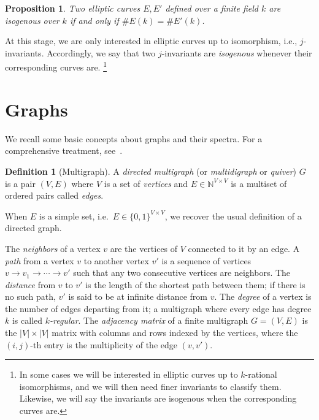 \documentclass[10pt]{article}
\theoremstyle{plain}
\newtheorem{proposition}[theorem]{Proposition}
\theoremstyle{definition}
\newtheorem{definition}[theorem]{Definition}
\begin{document}
\begin{prposition}
\begin{proposition}
  \label{coro:serre-tate}
  Two elliptic curves $E,E'$ defined over a finite field $k$ are
  isogenous over $k$ if and only if $\#E(k)=\#E'(k)$.
\end{proposition}

At this stage, we are only interested in elliptic curves up to
isomorphism, i.e., $j$-invariants. %
Accordingly, we say that two $j$-invariants are \emph{isogenous}
whenever their corresponding curves are.%
\footnote{In some cases we will be interested in elliptic curves up to
  $k$-rational isomorphisms, and we will then need finer invariants to
  classify them. %
  Likewise, we will say the invariants are isogenous when the
  corresponding curves are.}


\section{Graphs}
\label{sec:graphs}

We recall some basic concepts about graphs and their spectra. %
For a comprehensive treatment,
see~\cite{trevisan-graphs,tao2011expander,Goldreich2011}.

\begin{definition}[Multigraph]
  A \emph{directed multigraph} (or \emph{multidigraph} or \emph{quiver})
  $G$ is a pair $(V,E)$ where $V$ is a set of \emph{vertices} and
  $E∈ℕ^{V×V}$ is a multiset of ordered pairs called \emph{edges}.   
\end{definition}

When $E$ is a simple set, i.e.\ $E∈\{0,1\}^{V×V}$, we recover the
usual definition of a directed graph. %

The \emph{neighbors} of a vertex $v$ are the vertices of $V$ connected
to it by an edge. %
A \emph{path} from a vertex $v$ to another vertex $v'$ is a sequence
of vertices $v\to v_1\to\cdots\to v'$ such that any two consecutive
vertices are neighbors. %
The \emph{distance} from $v$ to $v'$ is the length of the shortest
path between them; if there is no such path, $v'$ is said to be at
infinite distance from $v$. %
The \emph{degree} of a vertex is the number of edges departing from
it; a multigraph where every edge has degree $k$ is called
\emph{$k$-regular}. %
The \emph{adjacency matrix} of a finite multigraph $G=(V,E)$ is the
$|V|×|V|$ matrix with columns and rows indexed by the vertices, where
the $(i,j)$-th entry is the multiplicity of the edge $(v,v')$.


\end{prposition}
\end{document}
